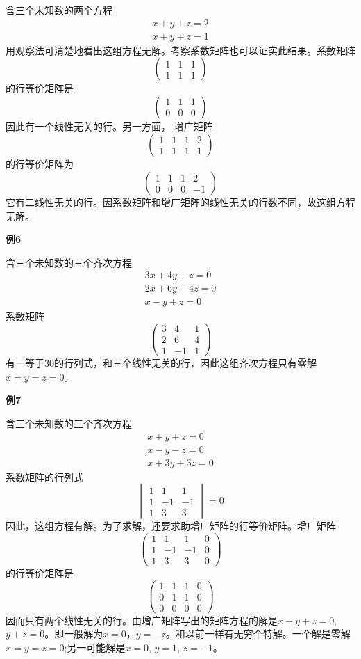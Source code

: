 含三个未知数的两个方程
\[
\begin{array}{c}
    x+y+z=2 \\ x+y+z=1
\end{array}
\]
用观察法可清楚地看出这组方程无解。考察系数矩阵也可以证实此结果。系数矩阵
\[
\begin{pmatrix}
    1 & 1 & 1 \\
    1 & 1 & 1
\end{pmatrix}    
\]
的行等价矩阵是
\[
\begin{pmatrix}
    1 & 1 & 1 \\
    0 & 0 & 0
\end{pmatrix}    
\]
因此有一个线性无关的行。另一方面， 增广矩阵
\[
\begin{pmatrix}
    1 & 1 & 1 & 2\\
    1 & 1 & 1 & 1
\end{pmatrix}    
\]
的行等价矩阵为
\[
\begin{pmatrix}
    1 & 1 & 1 & 2\\
    0 & 0 & 0 & -1
\end{pmatrix}    
\]
它有二线性无关的行。因系数矩阵和增广矩阵的线性无关的行数不同，故这组方程无解。

\textbf{例6}

含三个未知数的三个齐次方程
\[
\begin{array}{c}
    3x+4y+z=0 \\ 2x+6y+4z=0 \\ x-y+z=0
\end{array}
\]
系数矩阵
\[
\begin{pmatrix}
    3 & 4 & 1 \\
    2 & 6 & 4 \\
    1 & -1 & 1
\end{pmatrix}    
\]
有一等于$30$的行列式，和三个线性无关的行，因此这组齐次方程只有零解$x=y=z=0$。

\textbf{例7}

含三个未知数的三个齐次方程
\[
\begin{array}{c}
    x+y+z=0 \\ x-y-z=0 \\ x+3y+3z=0
\end{array}
\]
系数矩阵的行列式
\[
\begin{vmatrix}
    1 & 1 & 1 \\
    1 & -1 & -1 \\
    1 & 3 & 3
\end{vmatrix}   
=0 
\]
因此，这组方程有解。为了求解，还要求助增广矩阵的行等价矩阵。增广矩阵
\[
\begin{pmatrix}
    1 & 1 & 1 & 0 \\
    1 & -1 & -1 & 0 \\
    1 & 3 & 3 & 0 
\end{pmatrix}   
\]
的行等价矩阵是
\[
\begin{pmatrix}
    1 & 1 & 1 & 0 \\
    0 & 1 & 1 & 0 \\
    0 & 0 & 0 & 0 
\end{pmatrix}   
\]
因而只有两个线性无关的行。由增广矩阵写出的矩阵方程的解是$x+y+z=0$, $y+z=0$。即一般解为$x=0$，$y=-z$。和以前一样有无穷个特解。一个解是零解$x=y=z=0$;另一可能解是$x=0$, $y=1$, $z=-1$。

